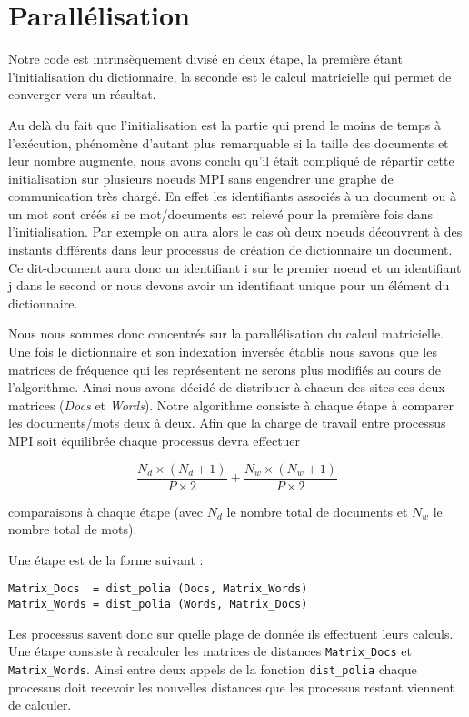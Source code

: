 \section{Parallélisation}

Notre code est intrinsèquement divisé en deux étape,
la première étant l'initialisation du dictionnaire,
la seconde est le calcul matricielle qui permet de
converger vers un résultat.

Au delà du fait que l'initialisation est la partie
qui prend le moins de temps à l'exécution,
phénomène d'autant plus remarquable si la taille des
documents et leur nombre augmente,
nous avons conclu qu'il était compliqué de répartir
cette initialisation sur plusieurs noeuds MPI sans
engendrer une graphe de communication très chargé.
En effet les identifiants associés à un document
ou à un mot sont créés si ce mot/documents est relevé
pour la première fois dans l'initialisation.
Par exemple on aura alors le cas où deux noeuds
découvrent à des instants différents dans leur processus
de création de dictionnaire un document.
Ce dit-document aura donc un identifiant i sur
le premier noeud et un identifiant j dans le second
or nous devons avoir un identifiant unique pour
un élément du dictionnaire.

Nous nous sommes donc concentrés sur la parallélisation
du calcul matricielle.
Une fois le dictionnaire et son indexation inversée
établis nous savons que les matrices de fréquence qui les
représentent ne serons plus modifiés au cours de l'algorithme.
Ainsi nous avons décidé de distribuer à chacun des sites
ces deux matrices ({\it Docs} et {\it Words}).
Notre algorithme consiste à chaque étape à comparer
les documents/mots deux à deux.
Afin que la charge de travail entre processus MPI soit
équilibrée chaque processus devra effectuer

\[ \frac{N_d \times (N_d+1)}{P \times 2}
 + \frac{N_w \times (N_w+1)}{P \times 2} \]

comparaisons à chaque étape
(avec $N_d$ le nombre total de documents
et $N_w$ le nombre total de mots).

Une étape est de la forme suivant :

\begin{verbatim}
Matrix_Docs  = dist_polia (Docs, Matrix_Words)
Matrix_Words = dist_polia (Words, Matrix_Docs)
\end{verbatim}

Les processus savent donc sur quelle plage de donnée
ils effectuent leurs calculs.
Une étape consiste à recalculer les matrices de distances
{\tt Matrix\_Docs} et {\tt Matrix\_Words}.
Ainsi entre deux appels de la fonction {\tt dist\_polia}
chaque processus doit recevoir les nouvelles distances que
les processus restant viennent de calculer.
